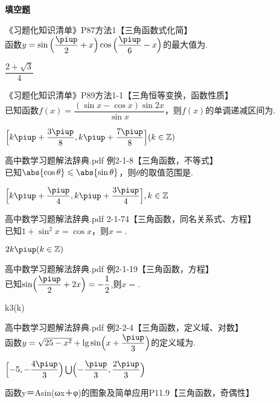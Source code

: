 \begin{exercise}{\bf 填空题}
\begin{answer}
      \end{answer}
    \item 《习题化知识清单》P87方法1【三角函数式化简】\\
      函数$y=\sin{\Bigl(\dfrac{\piup}2+x\Bigr)\cos{\Bigl(\dfrac{\piup}6-x\Bigr)}}$的最大值为\tk.
      \begin{answer}
        $\dfrac{2+\sqrt{3}}4$
      \end{answer}
    \item 《习题化知识清单》P89方法1-1【三角恒等变换，函数性质】\\
      已知函数$f(x)=\dfrac{(\sin x-\cos x)\sin {2x}}{\sin x}$，则$f(x)$的单调递减区间为\tk[6].
     \begin{answer}
       $\Bigl[k\piup+\dfrac{3\piup}8,k\piup+\dfrac{7\piup}8\Bigr](k\in\mathbb{Z})$
     \end{answer}
    \item 高中数学习题解法辞典.pdf 例2-1-8【三角函数，不等式】\\
     已知$\abs{\cos \theta}\leqslant \abs{\sin\theta}$，则$\theta$的取值范围是\tk.
     \begin{answer}
       $\Bigl[k\piup+\dfrac{\piup}4,k\piup+\dfrac{3\piup}4\Bigr],k\in\mathbb{Z}$
     \end{answer}
   \item 高中数学习题解法辞典.pdf 2-1-74【三角函数，同名关系式、方程】\\
     已知$1+\sin^2x=\cos x$，则$x=$\tk.
     \begin{answer}
       $2k\piup(k\in\mathbb{Z})$
     \end{answer}
    \item 高中数学习题解法辞典.pdf 例2-1-19【三角函数，方程】\\
     已知$\sin\Bigl(\dfrac{\piup}2+2x\Bigr)=-\dfrac12$,则$x=$\tk.
     \begin{answer}
       k\piup\pm\dfrac{\piup}3(k\in{})
     \end{answer}
    \item 高中数学习题解法辞典.pdf 例2-2-4【三角函数，定义域、对数】\\
     函数$y=\sqrt{25-x^2}+\lg\sin\Bigl(x+\dfrac{\piup}3\Bigr)$的定义域为\tk.
     \begin{answer}
       $\Bigl[-5,-\dfrac{4\piup}3\Bigr)\bigcup\Bigl(-\dfrac{\piup}3,\dfrac{2\piup}3\Bigr)$
     \end{answer}
    \item 函数y＝Asin(ωx＋φ)的图象及简单应用P11.9【三角函数，奇偶性】\\

\end{exercise}
